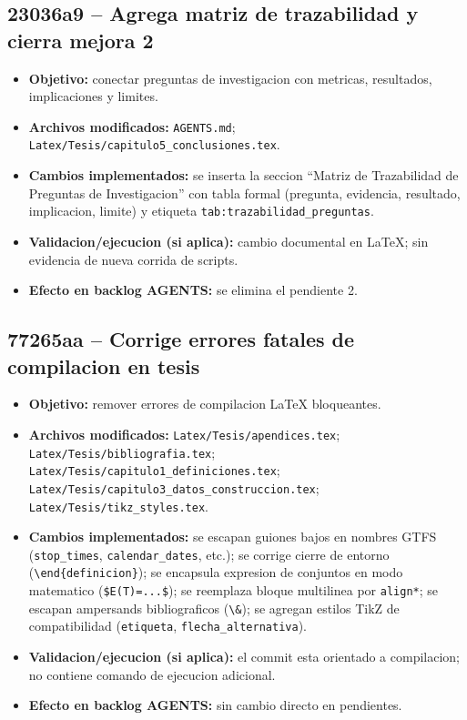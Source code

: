 \documentclass[11pt]{article}
\begin{document}
\subsection{23036a9 -- Agrega matriz de trazabilidad y cierra mejora 2}
\begin{itemize}
  \item \textbf{Objetivo:} conectar preguntas de investigacion con metricas, resultados, implicaciones y limites.
  \item \textbf{Archivos modificados:} \texttt{AGENTS.md}; \texttt{Latex/Tesis/capitulo5\_conclusiones.tex}.
  \item \textbf{Cambios implementados:} se inserta la seccion ``Matriz de Trazabilidad de Preguntas de Investigacion'' con tabla formal (pregunta, evidencia, resultado, implicacion, limite) y etiqueta \texttt{tab:trazabilidad\_preguntas}.
  \item \textbf{Validacion/ejecucion (si aplica):} cambio documental en \LaTeX; sin evidencia de nueva corrida de scripts.
  \item \textbf{Efecto en backlog AGENTS:} se elimina el pendiente 2.
\end{itemize}

\subsection{77265aa -- Corrige errores fatales de compilacion en tesis}
\begin{itemize}
  \item \textbf{Objetivo:} remover errores de compilacion \LaTeX{} bloqueantes.
  \item \textbf{Archivos modificados:} \texttt{Latex/Tesis/apendices.tex}; \texttt{Latex/Tesis/bibliografia.tex}; \texttt{Latex/Tesis/capitulo1\_definiciones.tex}; \texttt{Latex/Tesis/capitulo3\_datos\_construccion.tex}; \texttt{Latex/Tesis/tikz\_styles.tex}.
  \item \textbf{Cambios implementados:} se escapan guiones bajos en nombres GTFS (\texttt{stop\_times}, \texttt{calendar\_dates}, etc.); se corrige cierre de entorno (\texttt{\textbackslash end\{definicion\}}); se encapsula expresion de conjuntos en modo matematico (\texttt{\$E(T)=...\$}); se reemplaza bloque multilinea por \texttt{align*}; se escapan ampersands bibliograficos (\texttt{\textbackslash\&}); se agregan estilos TikZ de compatibilidad (\texttt{etiqueta}, \texttt{flecha\_alternativa}).
  \item \textbf{Validacion/ejecucion (si aplica):} el commit esta orientado a compilacion; no contiene comando de ejecucion adicional.
  \item \textbf{Efecto en backlog AGENTS:} sin cambio directo en pendientes.
\end{itemize}
\end{document}
